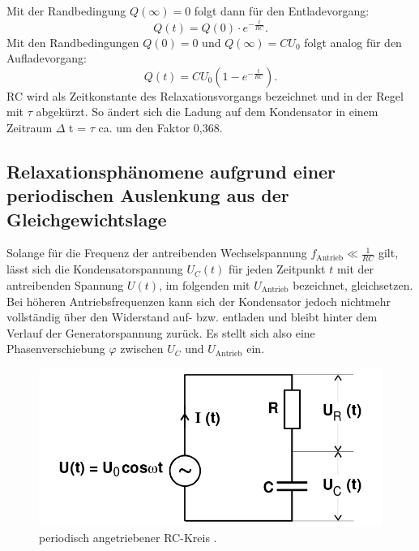Mit der Randbedingung $ Q(\infty)=0$ folgt dann für den Entladevorgang:
\begin{equation}
  Q(t) = Q(0) \cdot e^{-\frac{t}{RC}}\text{.}
\end{equation}
Mit den Randbedingungen $Q(0) = 0 $ und $Q(\infty) = CU_0$ folgt analog für
den Aufladevorgang:
\begin{equation}
  Q(t) = CU_0 \left(1-e^{-\frac{t}{RC}}\right)\text{.}
\end{equation}
RC wird als Zeitkonstante des Relaxationsvorgangs bezeichnet und in der Regel mit
 $\tau$ abgekürzt. So ändert sich die Ladung auf dem Kondensator in einem Zeitraum
 $\Delta$ t = $\tau$ ca. um den Faktor 0,368.

 \subsection{Relaxationsphänomene aufgrund einer periodischen Auslenkung aus der Gleichgewichtslage}

 Solange für die Frequenz der antreibenden Wechselspannung $ f_{\text{Antrieb}} \ll \frac{1}{RC} $ gilt, lässt sich die Kondensatorspannung
 $U_C(t)$ für jeden Zeitpunkt $t$ mit der antreibenden Spannung $U(t)$, im folgenden mit $U_{\text{Antrieb}}$ bezeichnet, gleichsetzen. Bei höheren Antriebsfrequenzen
 kann sich der Kondensator jedoch nichtmehr vollständig über den Widerstand
  auf- bzw. entladen und bleibt hinter dem Verlauf der Generatorspannung zurück.
  Es stellt sich also eine Phasenverschiebung $\varphi$ zwischen $U_C$ und $U_{\text{Antrieb}}$ ein.

\begin{figure}[H]
  \centering

  \includegraphics[width=\linewidth-200pt,height=\textheight-200pt,keepaspectratio]{content/RC_Kreis2.png}
  \caption{periodisch angetriebener RC-Kreis \cite{V353}.}
  \label{fig:RC_Kreis2}
\end{figure}


